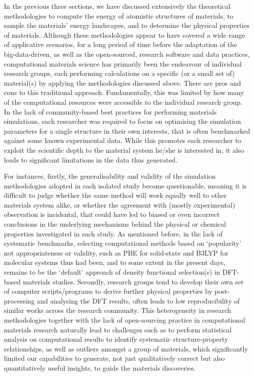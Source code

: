 In the previous three sections, we have discussed extensively the theoretical methodologies to compute the energy of atomistic structures of materials, to sample the materials' energy landscapes, and to determine the physical properties of materials. Although these methodologies appear to have covered a wide range of applicative scenarios, for a long period of time before the adaptation of the big-data-driven, as well as the open-sourced, research software and data practices, computational materials science has primarily been the endeavour of individual research groups, each performing calculations on a specific (or a small set of) material(s) by applying the methodologies discussed above. There are pros and cons to this traditional approach. Fundamentally, this was limited by how many of the computational resources were accessible to the individual research group. In the lack of community-based best practices for performing materials simulations, each researcher was required to focus on optimising the simulation parameters for a single structure in their own interests, that is often benchmarked against some known experimental data. While this promotes each researcher to exploit the scientific depth to the material system he/she is interested in, it also leads to significant limitations in the data thus generated. 

For instances, firstly, the generalisability and validity of the simulation methodologies adopted in each isolated study become questionable, meaning it is difficult to judge whether the same method will work equally well to other materials system alike, or whether the agreement with (mostly experimental) observation is incidental, that could have led to biased or even incorrect conclusions in the underlying mechanisms behind the physical or chemical properties investigated in each study. As mentioned before, in the lack of systematic benchmarks, selecting computational methods based on `popularity' not appropriateness or validity, such as PBE for solid-state and B3LYP\cite{kruse2012standard} for molecular systems thus had been, and to some extent in the present days, remains to be the `default' approach of density functional selection(s) in DFT-based materials studies. Secondly, research groups tend to develop their own set of computer scripts/programs to derive further physical properties by post-processing and analysing the DFT results, often leads to low reproducibility of similar  works across the research community. This heterogeneity in research methodologies together with the lack of open-sourcing practice in computational materials research naturally lead to challenges such as to perform statistical analysis on computational results to identify systematic structure-property relationships, as well as outliers amongst a group of materials, which significantly limited our capabilities to generate, not just qualitatively correct but also quantitatively useful insights, to guide the materials discoveries. 

